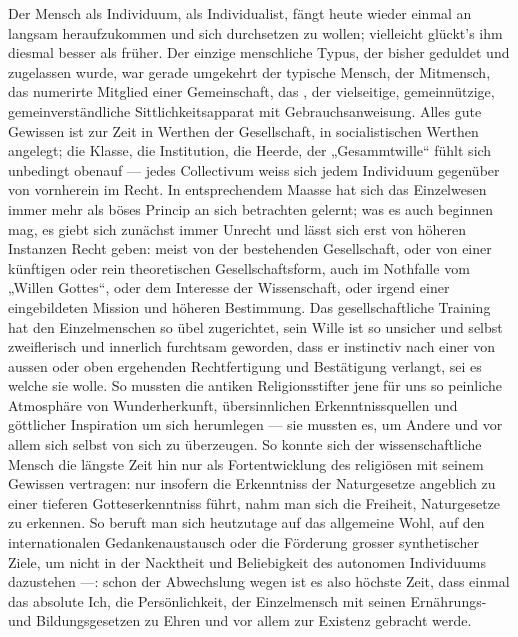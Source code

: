 Der Mensch als Individuum, als Individualist, fängt heute wieder einmal an langsam heraufzukommen und sich durchsetzen zu wollen; vielleicht glückt’s ihm diesmal besser als früher. Der einzige menschliche Typus, der bisher geduldet und zugelassen wurde, war gerade umgekehrt der typische Mensch, der Mitmensch, das numerirte Mitglied einer Gemeinschaft, das  , der vielseitige, gemeinnützige, gemeinverständliche Sittlichkeitsapparat mit Gebrauchsanweisung. Alles gute Gewissen ist zur Zeit in Werthen der Gesellschaft, in socialistischen Werthen angelegt; die Klasse, die Institution, die Heerde, der „Gesammtwille“ fühlt sich unbedingt obenauf — jedes Collectivum weiss sich jedem Individuum gegenüber von vornherein im Recht. In entsprechendem Maasse hat sich das Einzelwesen immer mehr als böses Princip an sich betrachten gelernt; was es auch beginnen mag, es giebt sich zunächst immer Unrecht und lässt sich erst von höheren Instanzen Recht geben: meist von der bestehenden Gesellschaft, oder von einer künftigen oder rein theoretischen Gesellschaftsform, auch im Nothfalle vom „Willen Gottes“, oder dem Interesse der Wissenschaft, oder irgend einer eingebildeten Mission und höheren Bestimmung. Das gesellschaftliche Training hat den Einzelmenschen so übel zugerichtet, sein Wille ist so unsicher und selbst zweiflerisch und innerlich furchtsam geworden, dass er instinctiv nach einer von aussen oder oben ergehenden Rechtfertigung und Bestätigung verlangt, sei es welche sie wolle. So mussten die antiken Religionsstifter jene für uns so peinliche Atmosphäre von Wunderherkunft, übersinnlichen Erkenntnissquellen und göttlicher Inspiration um sich herumlegen — sie mussten es, um Andere und vor allem sich selbst von sich zu überzeugen. So konnte sich der wissenschaftliche Mensch die längste Zeit hin nur als Fortentwicklung des religiösen mit seinem Gewissen vertragen: nur insofern die Erkenntniss der Naturgesetze angeblich zu einer tieferen Gotteserkenntniss führt, nahm man sich die Freiheit, Naturgesetze zu erkennen. So beruft man sich heutzutage auf das allgemeine Wohl, auf den internationalen Gedankenaustausch oder die Förderung grosser synthetischer Ziele, um nicht in der Nacktheit und Beliebigkeit des autonomen Individuums dazustehen —: schon der Abwechslung wegen ist es also höchste Zeit, dass einmal das absolute Ich, die Persönlichkeit, der Einzelmensch mit seinen Ernährungs- und Bildungsgesetzen zu Ehren und vor allem zur Existenz gebracht werde.
\par


